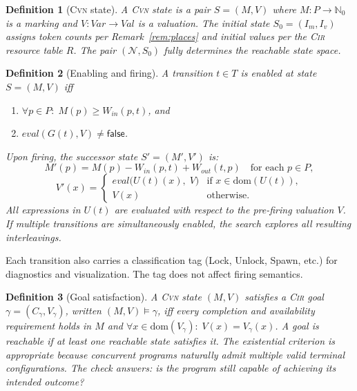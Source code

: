 \documentclass{article}
\newtheorem{definition}{Definition}
\begin{document}
\begin{definition}[\textsc{Cvn} state]
\label{def:cvn-state}
A \textsc{Cvn} state is a pair $S=(M,V)$ where
$M:P\to\mathbb{N}_0$ is a marking and
$V:\mathit{Var}\to\mathit{Val}$ is a valuation.  The initial state
$S_0=(I_m,I_v)$ assigns token counts per Remark~\ref{rem:places} and
initial values per the \textsc{Cir} resource table $R$.  The pair
$(\mathcal{N},S_0)$ fully determines the reachable state space.
\end{definition}

\begin{definition}[Enabling and firing]
\label{def:enabling-firing}
A transition $t\in T$ is \emph{enabled} at state $S=(M,V)$ iff
\begin{enumerate}
  \item $\forall p\in P:\; M(p)\geq W_{\!\mathit{in}}(p,t)$, and
  \item $\mathit{eval}(G(t),V)\neq\mathsf{false}$.
\end{enumerate}
Upon firing, the successor state $S'=(M',V')$ is:
\[
  M'(p)=M(p)-W_{\!\mathit{in}}(p,t)+W_{\!\mathit{out}}(t,p)
  \quad\text{for each }p\in P,
\]
\[
  V'(x)=
  \begin{cases}
    \mathit{eval}\bigl(U(t)(x),\;V\bigr)
      & \text{if } x\in\mathrm{dom}(U(t)),\\
    V(x) & \text{otherwise.}
  \end{cases}
\]
All expressions in $U(t)$ are evaluated with respect to the
pre-firing valuation $V$.  If multiple transitions are simultaneously
enabled, the search explores all resulting interleavings.
\end{definition}

Each transition also carries a classification tag (Lock, Unlock,
Spawn, etc.) for diagnostics and visualization.  The tag does not
affect firing semantics.

\begin{definition}[Goal satisfaction]
\label{def:goal-sat}
A \textsc{Cvn} state $(M,V)$ \emph{satisfies} a \textsc{Cir} goal
$\gamma=(C_\gamma,V_\gamma)$, written $(M,V)\models\gamma$, iff every
completion and availability requirement holds in $M$ and
$\forall x\in\mathrm{dom}(V_\gamma):\;V(x)=V_\gamma(x)$.
A goal is \emph{reachable} if at least one reachable state satisfies
it.  The existential criterion is appropriate because concurrent
programs naturally admit multiple valid terminal configurations.  The
check answers: is the program still \emph{capable} of achieving its
intended outcome?
\end{definition}
\end{document}
